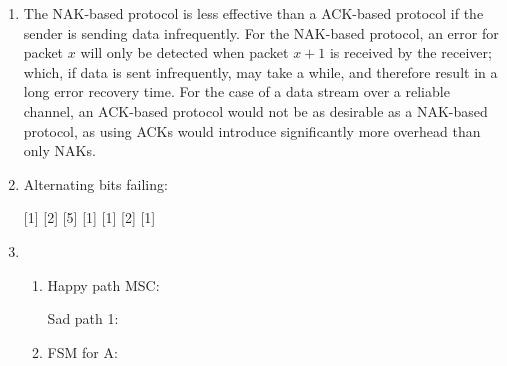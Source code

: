 \documentclass{article}
\begin{document}
\begin{enumerate}
\item The NAK-based protocol is less effective than a ACK-based protocol if the sender is sending data infrequently. For the NAK-based protocol, an error for packet $ x $ will only be detected when packet $ x + 1 $ is received by the receiver; which, if data is sent infrequently, may take a while, and therefore result in a long error recovery time. For the case of a data stream over a reliable channel, an ACK-based protocol would not be as desirable as a NAK-based protocol, as using ACKs would introduce significantly more overhead than only NAKs.

\item Alternating bits failing:

\begin{msc}{}
\setlength{\envinstdist}{2.8\envinstdist}

[1]
\nextlevel
{}
\nextlevel
{}[2]
\nextlevel
{}[5]
\nextlevel
{}
[1]
\nextlevel
{}
\nextlevel
{}[1]
\nextlevel
{}
\nextlevel
{}
[2]
\nextlevel
{}[1]
\nextlevel
{}

\end{msc}

\item
\begin{enumerate}
\item Happy path MSC:


Sad path 1: 
\item FSM for A: \\
\end{enumerate}
\end{enumerate}
\end{document}
